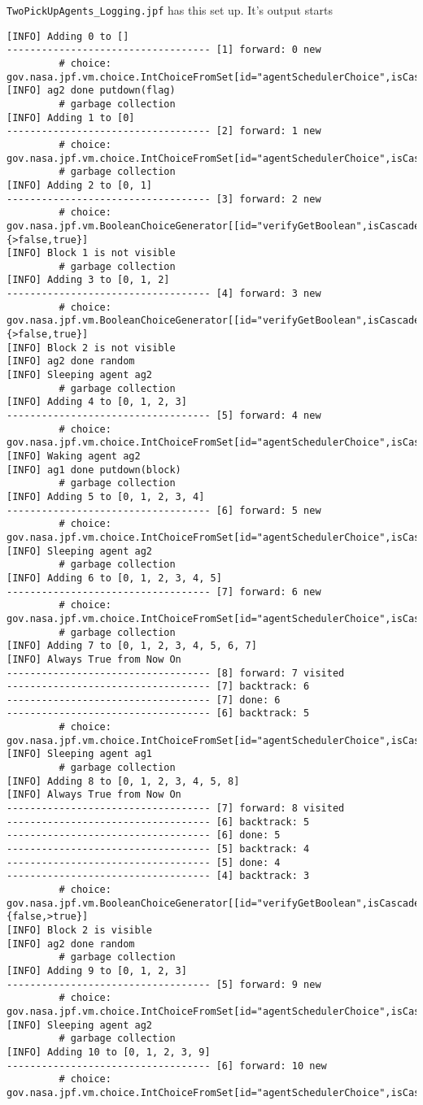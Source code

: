 \documentclass[a4]{article}
\begin{document}
\texttt{TwoPickUpAgents\_Logging.jpf} has this set up.  It's output starts

\begin{verbatim}
[INFO] Adding 0 to []
----------------------------------- [1] forward: 0 new
		 # choice: gov.nasa.jpf.vm.choice.IntChoiceFromSet[id="agentSchedulerChoice",isCascaded:false,>0,1]
[INFO] ag2 done putdown(flag)
		 # garbage collection
[INFO] Adding 1 to [0]
----------------------------------- [2] forward: 1 new
		 # choice: gov.nasa.jpf.vm.choice.IntChoiceFromSet[id="agentSchedulerChoice",isCascaded:false,>0,1]
		 # garbage collection
[INFO] Adding 2 to [0, 1]
----------------------------------- [3] forward: 2 new
		 # choice: gov.nasa.jpf.vm.BooleanChoiceGenerator[[id="verifyGetBoolean",isCascaded:false,{>false,true}]
[INFO] Block 1 is not visible
		 # garbage collection
[INFO] Adding 3 to [0, 1, 2]
----------------------------------- [4] forward: 3 new
		 # choice: gov.nasa.jpf.vm.BooleanChoiceGenerator[[id="verifyGetBoolean",isCascaded:false,{>false,true}]
[INFO] Block 2 is not visible
[INFO] ag2 done random
[INFO] Sleeping agent ag2
		 # garbage collection
[INFO] Adding 4 to [0, 1, 2, 3]
----------------------------------- [5] forward: 4 new
		 # choice: gov.nasa.jpf.vm.choice.IntChoiceFromSet[id="agentSchedulerChoice",isCascaded:false,>0]
[INFO] Waking agent ag2
[INFO] ag1 done putdown(block)
		 # garbage collection
[INFO] Adding 5 to [0, 1, 2, 3, 4]
----------------------------------- [6] forward: 5 new
		 # choice: gov.nasa.jpf.vm.choice.IntChoiceFromSet[id="agentSchedulerChoice",isCascaded:false,>0,1]
[INFO] Sleeping agent ag2
		 # garbage collection
[INFO] Adding 6 to [0, 1, 2, 3, 4, 5]
----------------------------------- [7] forward: 6 new
		 # choice: gov.nasa.jpf.vm.choice.IntChoiceFromSet[id="agentSchedulerChoice",isCascaded:false,>0]
		 # garbage collection
[INFO] Adding 7 to [0, 1, 2, 3, 4, 5, 6, 7]
[INFO] Always True from Now On
----------------------------------- [8] forward: 7 visited
----------------------------------- [7] backtrack: 6
----------------------------------- [7] done: 6
----------------------------------- [6] backtrack: 5
		 # choice: gov.nasa.jpf.vm.choice.IntChoiceFromSet[id="agentSchedulerChoice",isCascaded:false,0,>1]
[INFO] Sleeping agent ag1
		 # garbage collection
[INFO] Adding 8 to [0, 1, 2, 3, 4, 5, 8]
[INFO] Always True from Now On
----------------------------------- [7] forward: 8 visited
----------------------------------- [6] backtrack: 5
----------------------------------- [6] done: 5
----------------------------------- [5] backtrack: 4
----------------------------------- [5] done: 4
----------------------------------- [4] backtrack: 3
		 # choice: gov.nasa.jpf.vm.BooleanChoiceGenerator[[id="verifyGetBoolean",isCascaded:false,{false,>true}]
[INFO] Block 2 is visible
[INFO] ag2 done random
		 # garbage collection
[INFO] Adding 9 to [0, 1, 2, 3]
----------------------------------- [5] forward: 9 new
		 # choice: gov.nasa.jpf.vm.choice.IntChoiceFromSet[id="agentSchedulerChoice",isCascaded:false,>0,1]
[INFO] Sleeping agent ag2
		 # garbage collection
[INFO] Adding 10 to [0, 1, 2, 3, 9]
----------------------------------- [6] forward: 10 new
		 # choice: gov.nasa.jpf.vm.choice.IntChoiceFromSet[id="agentSchedulerChoice",isCascaded:false,>0]
\end{verbatim}
\end{document}

